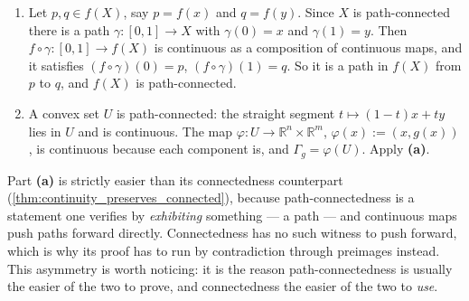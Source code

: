 \begin{exercisesolution}
\begin{enumerate}[label=\textbf{(\alph*)}]
  \item Let $p, q \in f(X)$, say $p = f(x)$ and $q = f(y)$. Since $X$ is path-connected there is
    a path $\gamma : [0,1] \to X$ with $\gamma(0)=x$ and $\gamma(1)=y$. Then
    $f \circ \gamma : [0,1] \to f(X)$ is continuous as a composition of continuous maps, and it
    satisfies $(f\circ\gamma)(0) = p$, $(f\circ\gamma)(1) = q$. So it is a path in $f(X)$ from
    $p$ to $q$, and $f(X)$ is path-connected.
  \item A convex set $U$ is path-connected: the straight segment $t \mapsto (1-t)x + ty$ lies in
    $U$ and is continuous. The map $\varphi : U \to \mathbb{R}^n\times\mathbb{R}^m$,
    $\varphi(x) := (x,g(x))$, is continuous because each component is, and
    $\Gamma_g = \varphi(U)$. Apply \textbf{(a)}.
\end{enumerate}

\begin{remark}
Part \textbf{(a)} is strictly easier than its connectedness counterpart
(\cref{thm:continuity_preserves_connected}), because path-connectedness is a statement one
verifies by \emph{exhibiting} something --- a path --- and continuous maps push paths forward
directly. Connectedness has no such witness to push forward, which is why its proof has to run
by contradiction through preimages instead. This asymmetry is worth noticing: it is the reason
path-connectedness is usually the easier of the two to prove, and connectedness the easier of
the two to \emph{use}.
\end{remark}
\end{exercisesolution}


